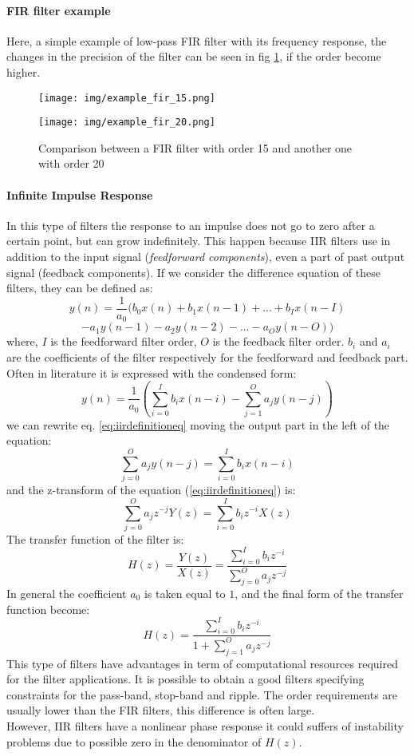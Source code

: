 \paragraph{FIR filter example}
Here, a simple example of low-pass FIR filter with its frequency response, the changes in the precision of the filter can be seen in fig \ref{fig:fir_example}, if the order become higher.
\begin{figure}[H]
\begin{minipage}{.5\textwidth}
\texttt{[image: img/example\_fir\_15.png]} 
\end{minipage}
\begin{minipage}{.5\textwidth}
\texttt{[image: img/example\_fir\_20.png]} 
\end{minipage}
\caption{Comparison between a FIR filter with order 15 and another one with order 20}\label{fig:fir_example}
\end{figure}
\paragraph{Infinite Impulse Response} In this type of filters the response to an impulse does not go to zero after a certain point, but can grow indefinitely. This happen because IIR filters use in addition to the input signal (\textit{feedforward components}), even a part of past output signal (feedback components). If we consider the difference equation of these filters, they can be defined as:
\[ y(n) = \frac{1}{a_0} (b_0x(n) + b_1x(n-1) + ... + b_Ix(n-I) \]
\[- a_1y(n-1) - a_2y(n-2) - ... - a_Oy(n-O))\]
where, $I$ is the feedforward filter order, $O$ is the feedback filter order.  $b_i$ and $a_i$ are the coefficients of the filter respectively for the feedforward and feedback part. Often in literature it is expressed with the condensed form:
\begin{equation}
y(n) = \frac{1}{a_0} (\sum_{i=0}^I b_ix(n-i) - \sum_{j=1}^O a_jy(n-j))
\label{eq:iirdefinitioneq}
\end{equation}
we can rewrite eq. \ref{eq:iirdefinitioneq} moving the output part in the left of the equation:
\[ \sum_{j=0}^O a_jy(n-j) = \sum_{i=0}^I b_ix(n-i) \]
and the z-transform of the equation (\ref{eq:iirdefinitioneq}) is:
\[ \sum_{j=0}^O a_jz^{-j} Y(z) = \sum_{i=0}^I b_iz^{-i}X(z) \]
The transfer function of the filter is:
\[ H(z) = \frac{Y(z)}{X(z)} = \frac{\sum_{i=0}^I b_iz^{-i}}{\sum_{j=0}^O a_jz^{-j}} \]
In general the coefficient $a_0$ is taken equal to $1$, and the final form of the transfer function become:
\begin{equation}
H(z) = \frac{\sum_{i=0}^I b_iz^{-i}}{1 + \sum_{j=1}^O a_jz^{-j}}
\end{equation}
This type of filters have advantages in term of computational resources required for the filter applications. It is possible to obtain a good filters specifying constraints for the pass-band, stop-band and ripple. The order requirements are usually lower than the FIR filters, this difference is often large.\\
However, IIR filters have a nonlinear phase response it could suffers of instability problems due to possible zero in the denominator of $H(z)$.
